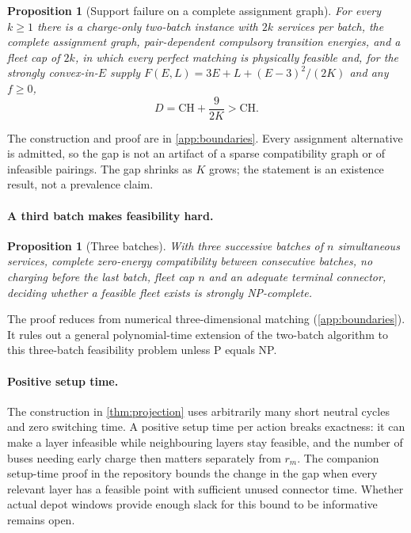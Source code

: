 \documentclass[11pt]{article}
\newtheorem{proposition}[theorem]{Proposition}
\theoremstyle{definition}\newtheorem{definition}[theorem]{Definition}
\theoremstyle{remark}\newtheorem{remark}[theorem]{Remark}
\newcommand{\CH}{\mathrm{CH}}
\begin{document}
\begin{proposition}[Support failure on a complete assignment graph]\label{prop:completegraph}
For every $k\ge1$ there is a charge-only two-batch instance with $2k$
services per batch, the complete assignment graph, pair-dependent compulsory
transition energies, and a fleet cap of $2k$, in which every perfect matching is
physically feasible and, for the strongly convex-in-$E$ supply
$F(E,L)=3E+L+(E-3)^2/(2K)$ and any $f\ge0$,
\[
 D=\CH+\frac{9}{2K}>\CH.
\]
\end{proposition}

The construction and proof are in \cref{app:boundaries}. Every assignment
alternative is admitted, so the gap is not an artifact of a sparse
compatibility graph or of infeasible pairings. The gap shrinks as $K$ grows; the
statement is an existence result, not a prevalence claim.

\paragraph{A third batch makes feasibility hard.}

\begin{proposition}[Three batches]\label{prop:threebatch}
With three successive batches of $n$ simultaneous services, complete zero-energy
compatibility between consecutive batches, no charging before the last batch,
fleet cap $n$ and an adequate terminal connector, deciding whether a feasible
fleet exists is strongly NP-complete.
\end{proposition}

The proof reduces from numerical three-dimensional matching
\citep[problem SP16]{garey1979} (\cref{app:boundaries}). It rules out a
general polynomial-time extension of the two-batch algorithm to this
three-batch feasibility problem unless P equals NP.

\paragraph{Positive setup time.} The construction in \cref{thm:projection} uses
arbitrarily many short neutral cycles and zero switching time. A positive setup
time per action breaks exactness: it can make a layer infeasible while
neighbouring layers stay feasible, and the number of buses needing early charge
then matters separately from $r_m$. The companion setup-time proof in the repository bounds the change in
the gap when every relevant layer has a feasible point with sufficient
unused connector time. Whether actual depot windows provide enough slack for
this bound to be informative remains open.
\end{document}
